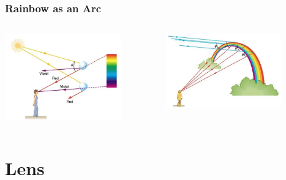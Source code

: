 \documentclass{beamer}
\begin{document}
\begin{frame}\frametitle{Rainbow as an Arc}
\begin{columns}
\begin{column}{5.5cm}
\begin{center}
\includegraphics[width=5cm]{fig/rainbow3.jpg}
\end{center}
\end{column}
\begin{column}{5.5cm}
\begin{center}
\includegraphics[width=5cm]{fig/rainbow4.jpg}
\end{center}
\end{column}
\end{columns}
\end{frame}


\section{Lens}
\end{document}
